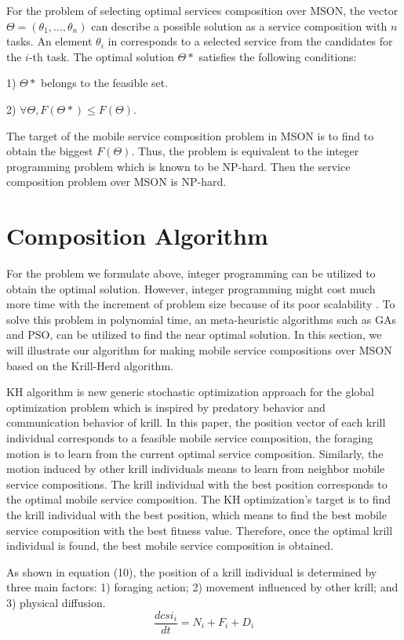 \documentclass[10pt,journal,compsoc]{IEEEtran}
\begin{document}
For the problem of selecting optimal services composition over MSON, the vector $\Theta= (\theta_1, . . . , \theta_n)$ can describe a possible solution as a service composition with $n$ tasks. An element $\theta_i$ in corresponds to a selected service from the candidates for the $i$-th task. The optimal solution  $\Theta*$ satisfies the following conditions:

1) $\Theta *$ belongs to the feasible set.

​2) $\forall \Theta, F(\Theta*) \le F(\Theta)$. 

The target of the mobile service composition problem in MSON is to find to obtain the biggest $F( \Theta)$. Thus, the problem is equivalent to the integer programming problem which is known to be NP-hard. Then the service composition problem over MSON is NP-hard.

\section{Composition Algorithm}
For the problem we formulate above, integer programming can be utilized to obtain the optimal solution. However, integer programming might cost much more time with the increment of problem size because of its poor scalability \cite{nemhauser1988integer}. To solve this problem in polynomial time, an meta-heuristic algorithms such as GAs and PSO, can be utilized to find the near optimal solution.
In this section, we will illustrate our algorithm for making mobile service compositions over MSON based on the Krill-Herd algorithm.

​KH algorithm \cite{gandomi2012krill} is new generic stochastic optimization approach for the global optimization problem which is inspired by predatory behavior and communication behavior of krill. 
In this paper, the position vector of each krill individual corresponds to a feasible mobile service composition, 
the foraging motion is to learn from the current optimal service composition. 
Similarly, the motion induced by other krill individuals means to learn from neighbor mobile service compositions.
The krill individual with the best position corresponds to the optimal mobile service composition. 
The KH optimization's target is to find the krill individual with the best position, which means to find the best mobile service composition with the best fitness value. 
Therefore, once the optimal krill individual is found, the best mobile service composition is obtained.

As shown in equation (10), the position of a krill individual is determined by three main factors: 1) foraging action; 2) movement influenced by other krill; and 3) physical diffusion. 
\begin{equation}
\frac{dcsi_i}{dt} =N_i+F_i+D_i
\end{equation}
\end{document}
